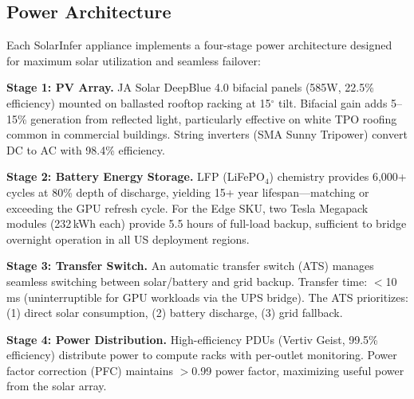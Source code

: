 \documentclass[conference,10pt,letterpaper]{IEEEtran}
\begin{document}
\subsection{Power Architecture}

Each SolarInfer appliance implements a four-stage power architecture designed for maximum solar utilization and seamless failover:

\textbf{Stage 1: PV Array.} JA Solar DeepBlue 4.0 bifacial panels (585W, 22.5\% efficiency) mounted on ballasted rooftop racking at 15$^\circ$ tilt. Bifacial gain adds 5--15\% generation from reflected light, particularly effective on white TPO roofing common in commercial buildings. String inverters (SMA Sunny Tripower) convert DC to AC with 98.4\% efficiency.

\textbf{Stage 2: Battery Energy Storage.} LFP (LiFePO$_4$) chemistry provides 6,000+ cycles at 80\% depth of discharge, yielding 15+ year lifespan---matching or exceeding the GPU refresh cycle. For the Edge SKU, two Tesla Megapack modules (232\,kWh each) provide 5.5 hours of full-load backup, sufficient to bridge overnight operation in all US deployment regions.

\textbf{Stage 3: Transfer Switch.} An automatic transfer switch (ATS) manages seamless switching between solar/battery and grid backup. Transfer time: $<$10\,ms (uninterruptible for GPU workloads via the UPS bridge). The ATS prioritizes: (1) direct solar consumption, (2) battery discharge, (3) grid fallback.

\textbf{Stage 4: Power Distribution.} High-efficiency PDUs (Vertiv Geist, 99.5\% efficiency) distribute power to compute racks with per-outlet monitoring. Power factor correction (PFC) maintains $>$0.99 power factor, maximizing useful power from the solar array.
\end{document}
